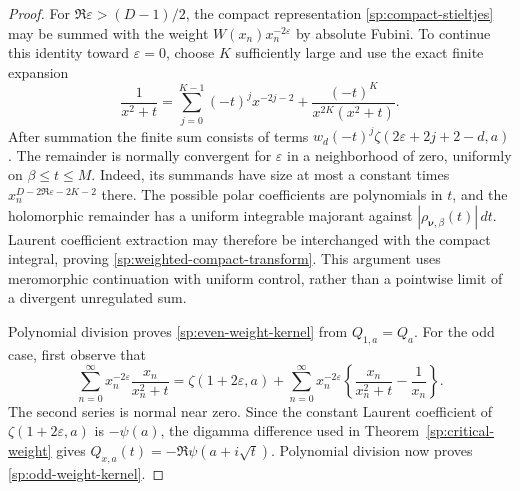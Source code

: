\documentclass[11pt,letterpaper]{article}
\numberwithin{equation}{section}
\theoremstyle{definition}
\theoremstyle{remark}
\begin{document}
\begin{proof}
For $\Re\varepsilon>(D-1)/2$, the compact representation
\eqref{sp:compact-stieltjes} may be summed with the weight
$W(x_n)x_n^{-2\varepsilon}$ by absolute Fubini.
To continue this identity toward $\varepsilon=0$, choose $K$
sufficiently large and use the exact finite expansion
\[
 \frac{1}{x^2+t}
 =\sum_{j=0}^{K-1}(-t)^j x^{-2j-2}
       +\frac{(-t)^K}{x^{2K}(x^2+t)}.
\]
After summation the finite sum consists of terms
$w_d(-t)^j\zeta(2\varepsilon+2j+2-d,a)$.
The remainder is normally convergent for $\varepsilon$ in a
neighborhood of zero, uniformly on $\beta\leq t\leq M$.
Indeed, its summands have size at most a constant times
$x_n^{D-2\Re\varepsilon-2K-2}$ there.
The possible polar coefficients are polynomials in $t$, and
the holomorphic remainder has a uniform integrable majorant
against $|\rho_{\boldsymbol\nu,\beta}(t)|\,dt$.
Laurent coefficient extraction may therefore be interchanged
with the compact integral, proving
\eqref{sp:weighted-compact-transform}.  This argument uses
meromorphic continuation with uniform control, rather than a
pointwise limit of a divergent unregulated sum.

Polynomial division proves \eqref{sp:even-weight-kernel} from
$Q_{1,a}=Q_a$.  For the odd case, first observe that
\[
 \sum_{n=0}^{\infty}x_n^{-2\varepsilon}
                \frac{x_n}{x_n^2+t}
 =\zeta(1+2\varepsilon,a)
  +\sum_{n=0}^{\infty}x_n^{-2\varepsilon}
        \left\{\frac{x_n}{x_n^2+t}-\frac1{x_n}\right\}.
\]
The second series is normal near zero.  Since the constant
Laurent coefficient of $\zeta(1+2\varepsilon,a)$ is $-\psi(a)$,
the digamma difference used in
Theorem~\ref{sp:critical-weight} gives
$Q_{x,a}(t)=-\Re\psi(a+i\sqrt t)$.
Polynomial division now proves \eqref{sp:odd-weight-kernel}.
\end{proof}
\end{document}
